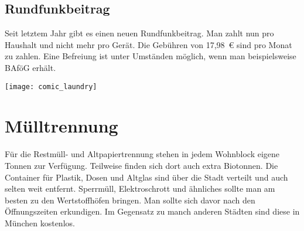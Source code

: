 \begin{multicols}{2}
\section{Rundfunkbeitrag}
Seit letztem Jahr gibt es einen neuen Rundfunkbeitrag. Man zahlt nun pro Haushalt und nicht mehr pro Gerät. Die Gebühren von 17,98~€ sind pro Monat zu zahlen. Eine Befreiung ist unter Umständen möglich, wenn man beispielsweise BAföG erhält.

\begin{urlList}
\end{urlList}

\columnbreak
\begin{center}
	\texttt{[image: comic\_laundry]}
\end{center}

\end{multicols}

\section{Mülltrennung}

Für die Restmüll- und Altpapiertrennung stehen in jedem Wohnblock eigene Tonnen zur Verfügung. Teilweise finden sich dort auch extra Biotonnen.
Die Container für Plastik, Dosen und Altglas sind über die Stadt verteilt und auch selten weit entfernt.
Sperrmüll, Elektroschrott und ähnliches sollte man am besten zu den Wertstoffhöfen bringen. Man sollte sich davor nach den Öffnungszeiten erkundigen. Im Gegensatz zu manch anderen Städten sind diese in München kostenlos.

\begin{urlList}
\end{urlList}

